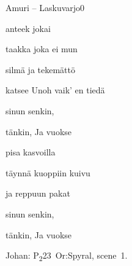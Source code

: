 \documentclass[12pt,a4paper]{article}
\begin{document}
\thispagestyle{empty}
\begin{mysong}{Amuri – Laskuvarjo}{0}

\begin{SBVerse}
   anteek  jokai

   taakka  joka ei mun 

   silmä ja  tekemättö

   katsee Unoh vaik' en tiedä
\end{SBVerse}

\begin{SBChorus}
   sinun   senkin, 

   tänkin,  Ja  
  vuokse
\end{SBChorus}


\begin{SBVerse}
    pisa kasvoilla 

   täynnä   kuoppiin
  kuivu

    ja  reppuun
  pakat
\end{SBVerse}

\begin{SBChorus}
   sinun   senkin, 

   tänkin,  Ja  
  vuokse
\end{SBChorus}

{\SBLyricNoteFont Johan: P\textsubscript{2}23~Or:Spyral, scene~1.}

\end{mysong}
\end{document}
